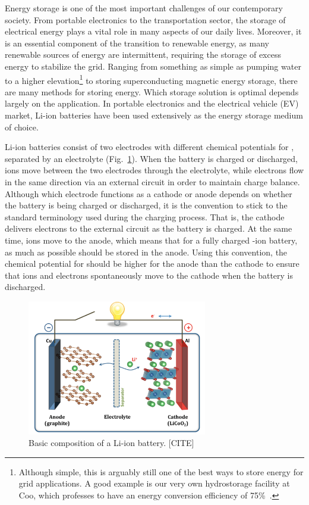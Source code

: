 \begin{refsection}
Energy storage is one of the most important challenges of our contemporary society. From portable electronics to the transportation sector, the storage of electrical energy plays a vital role in many aspects of our daily lives. Moreover, it is an essential component of the transition to renewable energy, as many renewable sources of energy are intermittent, requiring the storage of excess energy to stabilize the grid. Ranging from something as simple as pumping water to a higher elevation\footnote{Although simple, this is arguably still one of the best ways to store energy for grid applications. A good example is our very own hydrostorage facility at Coo, which professes to have an energy conversion efficiency of 75\%~\cite{Engie-Electrabel2015}.} to storing superconducting magnetic energy storage, there are many methods for storing energy. Which storage solution is optimal depends largely on the application. In portable electronics and the electrical vehicle (EV) market, Li-ion batteries have been used extensively as the energy storage medium of choice.

Li-ion batteries consist of two electrodes with different chemical potentials for , separated by an electrolyte (Fig.~\ref{batteries:fig-li_ion}). When the battery is charged or discharged,  ions move between the two electrodes through the electrolyte, while electrons flow in the same direction via an external circuit in order to maintain charge balance. Although which electrode functions as a cathode or anode depends on whether the battery is being charged or discharged, it is the convention to stick to the standard terminology used during the charging process. That is, the cathode delivers electrons to the external circuit as the battery is charged. At the same time,  ions move to the anode, which means that for a fully charged -ion battery, as much  as possible should be stored in the anode. Using this convention, the chemical potential for  should be higher for the anode than the cathode to ensure that  ions and electrons spontaneously move to the cathode when the battery is discharged.

\begin{figure}[h]
\centering
\includegraphics[width=0.7\textwidth]{./figures/batteries/li-ion_battery.png}
\caption{Basic composition of a Li-ion battery. [CITE]}
\label{batteries:fig-li_ion}
\end{figure}


\end{refsection}
